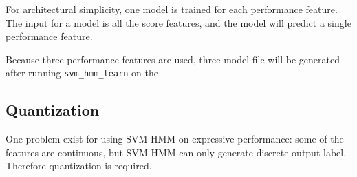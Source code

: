 For architectural simplicity, one model is trained for each performance feature. The input for a model is all the score features, and the model will predict a single performance feature. 


Because three performance features are used, three model file will be generated after running \texttt{svm\_hmm\_learn} on the 

\subsection{Quantization}
One problem exist for using SVM-HMM on expressive performance: some of the features are continuous, but SVM-HMM can only generate discrete output label. Therefore quantization is required. 

